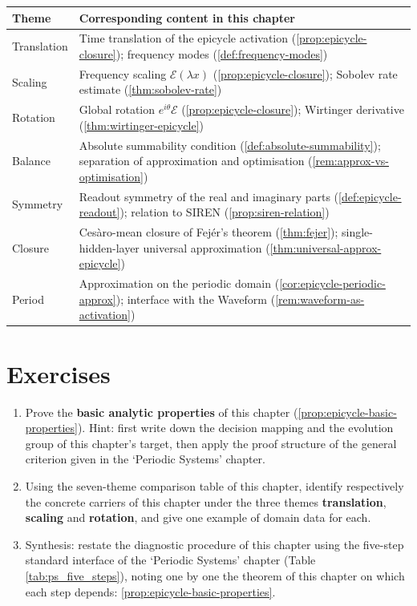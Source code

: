 \begin{center}
\renewcommand{\arraystretch}{1.3}
\begin{tabular}{@{}p{2.3cm} p{10.4cm}@{}}
\toprule
Theme & Corresponding content in this chapter \\
\midrule
Translation & Time translation of the epicycle activation (\cref{prop:epicycle-closure}); frequency modes (\cref{def:frequency-modes}) \\
Scaling & Frequency scaling $\mathcal E(\lambda x)$ (\cref{prop:epicycle-closure}); Sobolev rate estimate (\cref{thm:sobolev-rate}) \\
Rotation & Global rotation $e^{i\theta}\mathcal E$ (\cref{prop:epicycle-closure}); Wirtinger derivative (\cref{thm:wirtinger-epicycle}) \\
Balance & Absolute summability condition (\cref{def:absolute-summability}); separation of approximation and optimisation (\cref{rem:approx-vs-optimisation}) \\
Symmetry & Readout symmetry of the real and imaginary parts (\cref{def:epicycle-readout}); relation to SIREN (\cref{prop:siren-relation}) \\
Closure & Cesàro-mean closure of Fejér's theorem (\cref{thm:fejer}); single-hidden-layer universal approximation (\cref{thm:universal-approx-epicycle}) \\
Period & Approximation on the periodic domain (\cref{cor:epicycle-periodic-approx}); interface with the Waveform (\cref{rem:waveform-as-activation}) \\
\bottomrule
\end{tabular}
\end{center}

\section*{Exercises}

\begin{enumerate}[leftmargin=3em, label=\textbf{Exercise \arabic*}]
    \item Prove the \textbf{basic analytic properties} of this chapter (\ref{prop:epicycle-basic-properties}). Hint: first write down the decision mapping and the evolution group of this chapter's target, then apply the proof structure of the general criterion given in the `Periodic Systems' chapter.

    \item Using the seven-theme comparison table of this chapter, identify respectively the concrete carriers of this chapter under the three themes \textbf{translation}, \textbf{scaling} and \textbf{rotation}, and give one example of domain data for each.

    \item Synthesis: restate the diagnostic procedure of this chapter using the five-step standard interface of the `Periodic Systems' chapter (Table \ref{tab:ps_five_steps}), noting one by one the theorem of this chapter on which each step depends: \ref{prop:epicycle-basic-properties}.
\end{enumerate}

